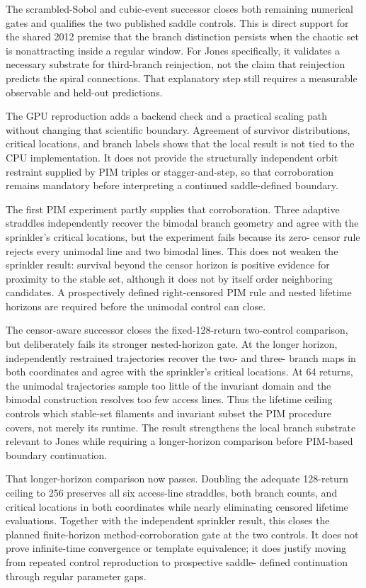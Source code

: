 The scrambled-Sobol and cubic-event successor closes both remaining numerical
gates and qualifies the two published saddle controls.  This is direct support
for the shared 2012 premise that the branch distinction persists when the
chaotic set is nonattracting inside a regular window.  For Jones specifically,
it validates a necessary substrate for third-branch reinjection, not the claim
that reinjection predicts the spiral connections.  That explanatory step still
requires a measurable observable and held-out predictions.

The GPU reproduction adds a backend check and a practical scaling path without
changing that scientific boundary.  Agreement of survivor distributions,
critical locations, and branch labels shows that the local result is not tied
to the CPU implementation.  It does not provide the structurally independent
orbit restraint supplied by PIM triples or stagger-and-step, so that
corroboration remains mandatory before interpreting a continued saddle-defined
boundary.

The first PIM experiment partly supplies that corroboration.  Three adaptive
straddles independently recover the bimodal branch geometry and agree with the
sprinkler's critical locations, but the experiment fails because its zero-
censor rule rejects every unimodal line and two bimodal lines.  This does not
weaken the sprinkler result: survival beyond the censor horizon is positive
evidence for proximity to the stable set, although it does not by itself order
neighboring candidates.  A prospectively defined right-censored PIM rule and
nested lifetime horizons are required before the unimodal control can close.

The censor-aware successor closes the fixed-128-return two-control comparison,
but deliberately fails its stronger nested-horizon gate.  At the longer
horizon, independently restrained trajectories recover the two- and three-
branch maps in both coordinates and agree with the sprinkler's critical
locations.  At 64 returns, the unimodal trajectories sample too little of the
invariant domain and the bimodal construction resolves too few access lines.
Thus the lifetime ceiling controls which stable-set filaments and invariant
subset the PIM procedure covers, not merely its runtime.  The result strengthens
the local branch substrate relevant to Jones while requiring a longer-horizon
comparison before PIM-based boundary continuation.

That longer-horizon comparison now passes.  Doubling the adequate 128-return
ceiling to 256 preserves all six access-line straddles, both branch counts, and
critical locations in both coordinates while nearly eliminating censored
lifetime evaluations.  Together with the independent sprinkler result, this
closes the planned finite-horizon method-corroboration gate at the two controls.
It does not prove infinite-time convergence or template equivalence; it does
justify moving from repeated control reproduction to prospective saddle-
defined continuation through regular parameter gaps.

